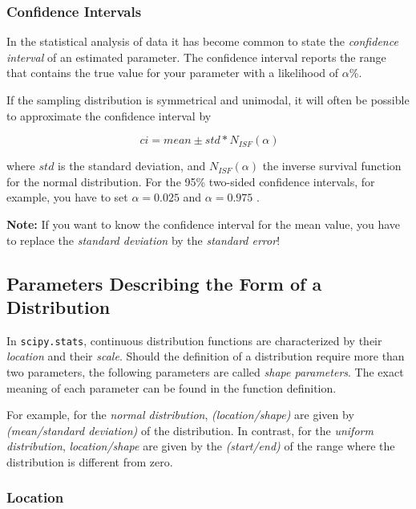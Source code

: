 \subsubsection{Confidence Intervals}

 In the statistical analysis of data it has become common to state the \emph{confidence interval} of an estimated parameter. The confidence interval reports the range that contains the true value for your parameter with a likelihood of $\alpha$\%.

If the sampling distribution is symmetrical and unimodal, it will often be possible to approximate the confidence interval by

\begin{equation}\
  ci = mean \pm std * N_{ISF}(\alpha)
\end{equation}\label{eq:ci}

where $std$ is the  standard deviation, and $N_{ISF}(\alpha)$ the inverse survival function for the normal distribution. For the 95\% two-sided confidence intervals, for example, you have to set $\alpha=0.025$ and $\alpha=0.975$ .

\textbf{Note:} If you want to know the confidence interval for the mean value, you have to replace the \emph{standard deviation} by the \emph{standard error}!

\subsection{Parameters Describing the Form of a Distribution}

In \lstinline{scipy.stats}, continuous distribution functions are characterized by their \emph{location} and their \emph{scale}. Should the definition of a distribution require more than two parameters, the following parameters are called \emph{shape parameters}.  The exact meaning of each parameter can be found in the function definition.

For example, for the \emph{normal distribution}, \emph{(location/shape)} are given by \emph{(mean/standard deviation)} of the distribution. In contrast, for the \emph{uniform distribution}, \emph{location/shape} are given by the \emph{(start/end)} of the range where the distribution is different from zero.

\subsubsection{Location}

